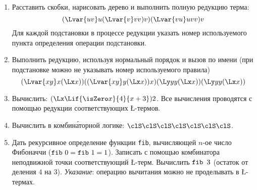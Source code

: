 \begin{enumerate}
    \itemsep=\myitemsep
    \item Расставить скобки, нарисовать дерево и выполнить полную редукцию
    терма:
    \[
        (\Lvar{uv} u (\Lvar{v} vv) v) (\Lvar{vu} uvv) v  
    \]
    Для каждой подстановки в процессе редукции указать номер используемого
    пункта определения операции подстановки.
    \item Выполнить редукцию, используя нормальный порядок и вызов по имени
    (при подстановке можно не указывать номер используемого правила)
    \[
        (\Lvar{xy} x (\Lx x)) ((\Lvar{xy} y (\Lx x))x) (\Ly yy (\Lx x))
            (\Ly yy(\Lx x))  
    \]
    \item Вычислить: $(\Lx \Lif {\isZero x} {4} {x + 3})2$. Все вычисления
    проводятся с помощью редукции соответствующих \L-термов.
    \item Вычислить в комбин\'{а}торной логике:
    $\clS \clS \clS \clS \clS \clS \clS$.
    \item Дать рекурсивное определение функции \texttt{fib}, вычисляющей
    $n$-ое число Фибоначчи ($\text{\texttt{fib} } 0 = \text{\texttt{fib}
    } 1 = 1$). Записать с помощью комбинатора неподвижной точки соответствующий
    \L-терм. Вычислить $\text{\ttfamily fib } 3$ (остаток от деления 4 на 3).
    \emph{Указание}: операцию вычитания можно не проделывать в \L-термах.
\end{enumerate}